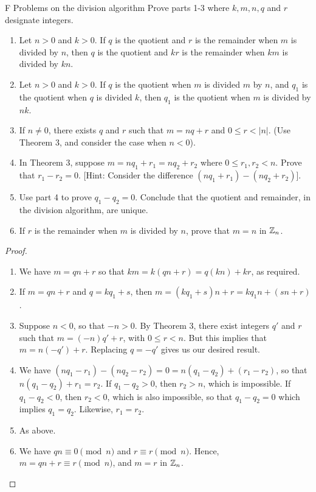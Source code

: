 \begin{exercise}{F Problems on the division algorithm}
Prove parts 1-3 where $k,m,n,q$ and $r$ designate integers.
\begin{enumerate}
    \item Let $n>0$ and $k>0$. If $q$ is the quotient and $r$ is the remainder when $m$ is divided by $n$, then $q$ is the quotient and $kr$ is the remainder when $km$ is divided by $kn$.
    \item Let $n>0$ and $k>0$. If $q$ is the quotient when $m$ is divided $m$ by $n$, and $q_{1}$ is the quotient when $q$ is divided $k$, then $q_{1}$ is the quotient when $m$ is divided by $nk$.
    \item If $n\neq 0$, there exists $q$ and $r$ such that $m=nq+r$ and $0\leq r<\lvert n\rvert$. (Use Theorem 3, and consider the case when $n<0$).
    \item In Theorem 3, suppose $m=nq_{1}+r_{1}=nq_{2}+r_{2}$ where $0\leq r_{1},r_{2}<n$. Prove that $r_{1}-r_{2}=0$. [Hint: Consider the difference $(nq_{1}+r_{1})-(nq_{2}+r_{2})$].
    \item Use part 4 to prove $q_{1}-q_{2}=0$. Conclude that the quotient and remainder, in the division algorithm, are unique. 
    \item If $r$ is the remainder when $m$ is divided by $n$, prove that $m=n$ in $\mathbb{Z}_{n}$.
\end{enumerate}
\end{exercise}
\begin{proof}
 \begin{enumerate}
    \item We have $m=qn+r$ so that $km=k(qn+r)=q(kn)+kr$, as required.
    \item If $m=qn+r$ and $q=kq_{1}+s$, then $m=(kq_{1}+s)n+r= kq_{1}n+(sn+r)$.
    \item Suppose $n<0$, so that $-n>0$. By Theorem 3, there exist integers $q'$ and $r$ such that $m=(-n)q'+r$, with $0\leq r<n$. But this implies that $m=n(-q')+r$. Replacing $q=-q'$ gives us our desired result.
    \item We have $(nq_{1}-r_{1})-(nq_{2}-r_{2})=0 = n(q_{1}-q_{2})+(r_{1}-r_{2})$, so that $n(q_{1}-q_{2})+r_{1}=r_{2}$. If $q_{1}-q_{2}>0$, then $r_{2}>n$, which is impossible. If $q_{1}-q_{2}<0$, then $r_{2}<0$, which is also impossible, so that $q_{1}-q_{2}=0$ which implies $q_{1}=q_{2}$. Likewise, $r_{1}=r_{2}$.
    \item As above.
    \item We have $qn\equiv 0\pmod{n}$ and $r\equiv r\pmod{n}$. Hence, $m=qn+r\equiv r\pmod{n}$, and $m=r$ in $\mathbb{Z}_{n}$.
\end{enumerate}
\end{proof}